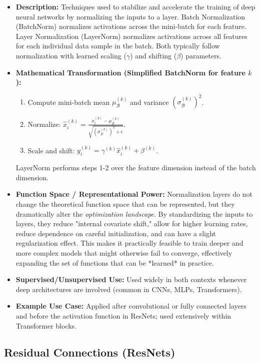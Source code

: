\documentclass{article}
\begin{document}
\begin{itemize}
    \item \textbf{Description:} Techniques used to stabilize and accelerate the training of deep neural networks by normalizing the inputs to a layer. Batch Normalization (BatchNorm) normalizes activations across the mini-batch for each feature. Layer Normalization (LayerNorm) normalizes activations across all features for each individual data sample in the batch. Both typically follow normalization with learned scaling ($\gamma$) and shifting ($\beta$) parameters.
    \item \textbf{Mathematical Transformation (Simplified BatchNorm for feature $k$):}
        \begin{enumerate}
            \item Compute mini-batch mean $\mu_{\mathcal{B}}^{(k)}$ and variance $(\sigma_{\mathcal{B}}^{(k)})^2$.
            \item Normalize: $\hat{x}_i^{(k)} = \frac{x_i^{(k)} - \mu_{\mathcal{B}}^{(k)}}{\sqrt{(\sigma_{\mathcal{B}}^{(k)})^2 + \epsilon}}$.
            \item Scale and shift: $y_i^{(k)} = \gamma^{(k)} \hat{x}_i^{(k)} + \beta^{(k)}$.
        \end{enumerate}
        LayerNorm performs steps 1-2 over the feature dimension instead of the batch dimension.
    \item \textbf{Function Space / Representational Power:} Normalization layers do not change the theoretical function space that can be represented, but they dramatically alter the \emph{optimization landscape}. By standardizing the inputs to layers, they reduce "internal covariate shift," allow for higher learning rates, reduce dependence on careful initialization, and can have a slight regularization effect. This makes it practically feasible to train deeper and more complex models that might otherwise fail to converge, effectively expanding the set of functions that can be *learned* in practice.
    \item \textbf{Supervised/Unsupervised Use:} Used widely in both contexts whenever deep architectures are involved (common in CNNs, MLPs, Transformers).
    \item \textbf{Example Use Case:} Applied after convolutional or fully connected layers and before the activation function in ResNets; used extensively within Transformer blocks.
\end{itemize}

\subsection{Residual Connections (ResNets)}
\end{document}

